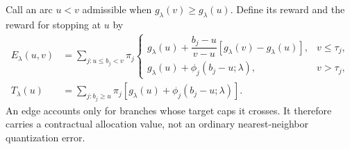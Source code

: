 Call an arc $u<v$ admissible when $g_\lambda(v)\geq g_\lambda(u)$. Define its reward and the reward for stopping at $u$ by
\begin{align}
 E_\lambda(u,v)&=\sum_{j:u\leq b_j<v}\pi_j
 \begin{cases}
 g_\lambda(u)+\dfrac{b_j-u}{v-u}[g_\lambda(v)-g_\lambda(u)],&v\leq\tau_j,\\
 g_\lambda(u)+\phi_j(b_j-u;\lambda),&v>\tau_j,
 \end{cases}\label{eq:r43-edge}\\
 T_\lambda(u)&=\sum_{j:b_j\geq u}\pi_j
      [g_\lambda(u)+\phi_j(b_j-u;\lambda)].\label{eq:r43-tail}
\end{align}
An edge accounts only for branches whose target caps it crosses. It therefore carries a contractual allocation value, not an ordinary nearest-neighbor quantization error.

